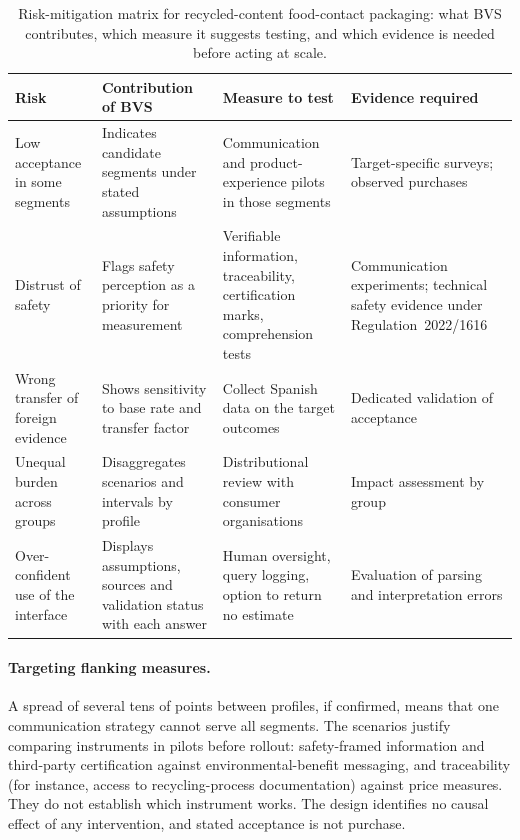 \begin{table}[htbp]
\centering
\caption{Risk-mitigation matrix for recycled-content food-contact packaging:
what BVS contributes, which measure it suggests testing, and which evidence is
needed before acting at scale.}
\label{tab:mitigation}
\small
\begin{tabularx}{\textwidth}{>{\raggedright\arraybackslash}p{2.9cm}XXX}
\toprule
\textbf{Risk} & \textbf{Contribution of BVS} & \textbf{Measure to test} &
  \textbf{Evidence required} \\
\midrule
Low acceptance in some segments & Indicates candidate segments under stated
  assumptions & Communication and product-experience pilots in those segments
  & Target-specific surveys; observed purchases \\
Distrust of safety & Flags safety perception as a priority for measurement &
  Verifiable information, traceability, certification marks, comprehension
  tests & Communication experiments; technical safety evidence under
  Regulation~2022/1616 \\
Wrong transfer of foreign evidence & Shows sensitivity to base rate and
  transfer factor & Collect Spanish data on the target outcomes & Dedicated
  validation of acceptance \\
Unequal burden across groups & Disaggregates scenarios and intervals by
  profile & Distributional review with consumer organisations & Impact
  assessment by group \\
Over-confident use of the interface & Displays assumptions, sources and
  validation status with each answer & Human oversight, query logging, option
  to return no estimate & Evaluation of parsing and interpretation errors \\
\bottomrule
\end{tabularx}
\end{table}

\paragraph{Targeting flanking measures.}
A spread of several tens of points between profiles, if confirmed, means that
one communication strategy cannot serve all segments. The scenarios justify
comparing instruments in pilots before rollout: safety-framed information and
third-party certification against environmental-benefit messaging, and
traceability (for instance, access to recycling-process documentation)
against price measures. They do not establish which instrument works. The
design identifies no causal effect of any intervention, and stated acceptance
is not purchase.

